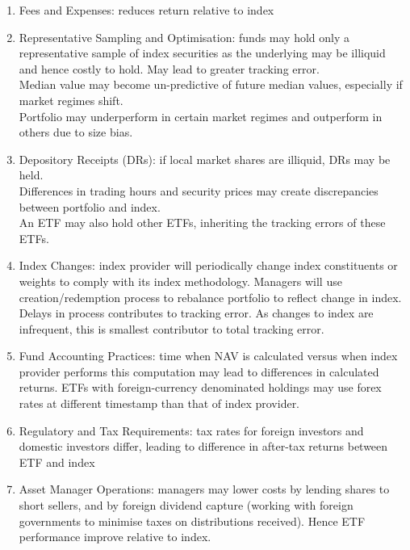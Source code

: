 \begin{remark} 
\begin{enumerate}[label=\roman*.]
\setlength{\itemsep}{0pt}
\item Fees and Expenses: reduces return relative to index
\item Representative Sampling and Optimisation: funds may hold only a representative sample of index securities as the underlying may be illiquid and hence costly to hold. May lead to greater tracking error. \\
Median value may become un-predictive of future median values, especially if market regimes shift.\\
Portfolio may underperform in certain market regimes and outperform in others due to size bias.
\item Depository Receipts (DRs): if local market shares are illiquid, DRs may be held.\\
Differences in trading hours and security prices may create discrepancies between portfolio and index.\\
An ETF may also hold other ETFs, inheriting the tracking errors of these ETFs.
\item Index Changes: index provider will periodically change index constituents or weights to comply with its index methodology. Managers will use creation/redemption process to rebalance portfolio to reflect change in index. Delays in process contributes to tracking error. As changes to index are infrequent, this is smallest contributor to total tracking error.
\item Fund Accounting Practices: time when NAV is calculated versus when index provider performs this computation may lead to differences in calculated returns. ETFs with foreign-currency denominated holdings may use forex rates at different timestamp than that of index provider.
\item Regulatory and Tax Requirements: tax rates for foreign investors and domestic investors differ, leading to difference in after-tax returns between ETF and index
\item Asset Manager Operations: managers may lower costs by lending shares to short sellers, and by foreign dividend capture (working with foreign governments to minimise taxes on distributions received). Hence ETF performance improve relative to index.
\end{enumerate}
\end{remark}

